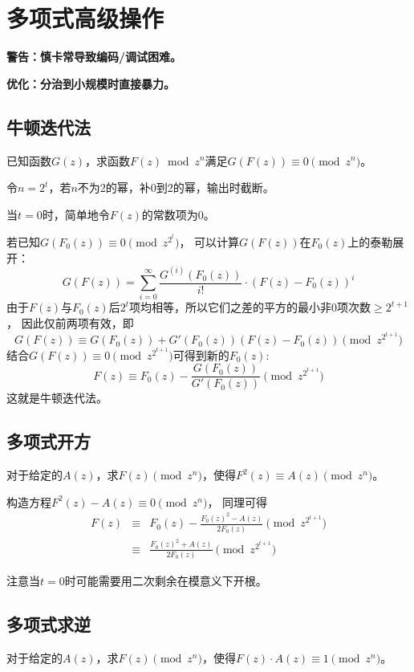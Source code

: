 \section{多项式高级操作}
{\bfseries 警告：慎卡常导致编码/调试困难。}

{\bfseries 优化：分治到小规模时直接暴力。}
\subsection{牛顿迭代法}
已知函数$G(z)$，求函数$F(z) \bmod{z^n}$满足$G(F(z))\equiv 0 \pmod{z^n}$。

令$n=2^t$，若$n$不为2的幂，补0到2的幂，输出时截断。

当$t=0$时，简单地令$F(z)$的常数项为0。

若已知$G(F_0(z)) \equiv 0\pmod{z^{2^t}}$，
可以计算$G(F(z))$在$F_0(z)$上的泰勒展开：
\begin{displaymath}
    G(F(z))=\sum_{i=0}^\infty{\frac{G^{(i)}(F_0(z))}{i!}\cdot (F(z)-F_0(z))^i}
\end{displaymath}
由于$F(z)$与$F_0(z)$后$2^t$项均相等，所以它们之差的平方的最小非0项次数$\geq 2^{t+1}$，
因此仅前两项有效，即
\begin{displaymath}
    G(F(z))\equiv G(F_0(z))+G'(F_0(z))(F(z)-F_0(z)) \pmod{z^{2^{t+1}}}
\end{displaymath}
结合$G(F(z))\equiv 0 \pmod{z^{2^{t+1}}}$可得到新的$F_0(z)$:
\begin{displaymath}
    F(z)\equiv F_0(z)-\frac{G(F_0(z))}{G'(F_0(z))} \pmod{z^{2^{t+1}}}
\end{displaymath}
这就是牛顿迭代法。
\subsection{多项式开方}
对于给定的$A(z)$，求$F(z) \pmod z^n$，使得$F^2(z)\equiv A(z)\pmod{z^n}$。

构造方程$F^2(z)-A(z)\equiv 0\pmod{z^n}$，
同理可得
\begin{eqnarray*}
    F(z)&\equiv& F_0(z)-\frac{F_0(z)^2-A(z)}{2F_0(z)} \pmod{z^{2^{t+1}}}\\
    &\equiv& \frac{F_0(z)^2+A(z)}{2F_0(z)} \pmod{z^{2^{t+1}}}
\end{eqnarray*}

注意当$t=0$时可能需要用二次剩余在模意义下开根。

\subsection{多项式求逆}
对于给定的$A(z)$，求$F(z) \pmod{z^n}$，使得$F(z)\cdot A(z)\equiv 1\pmod{z^n}$。

